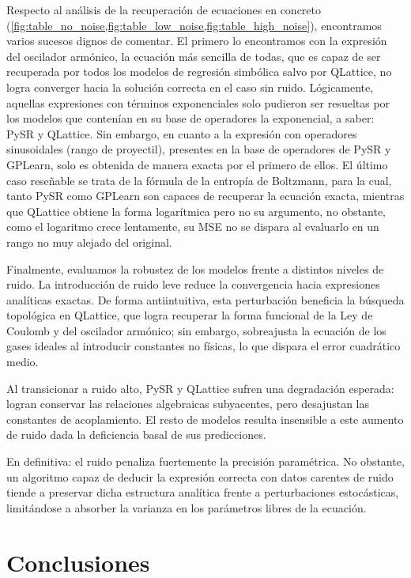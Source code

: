 \documentclass[11pt, a4paper]{article}
\begin{document}
Respecto al análisis de la recuperación de ecuaciones en concreto (\cref{fig:table_no_noise,fig:table_low_noise,fig:table_high_noise}), encontramos varios sucesos dignos de comentar. El primero lo encontramos con la expresión del oscilador armónico, la ecuación más sencilla de todas, que es capaz de ser recuperada por todos los modelos de regresión simbólica salvo por QLattice, no logra converger hacia la solución correcta en el caso sin ruido. Lógicamente, aquellas expresiones con términos exponenciales solo pudieron ser resueltas por los modelos que contenían en su base de operadores la exponencial, a saber: PySR y QLattice. Sin embargo, en cuanto a la expresión con operadores sinusoidales (rango de proyectil), presentes en la base de operadores de PySR y GPLearn, solo es obtenida de manera exacta por el primero de ellos. El último caso reseñable se trata de la fórmula de la entropía de Boltzmann, para la cual, tanto PySR como GPLearn son capaces de recuperar la ecuación exacta, mientras que QLattice obtiene la forma logarítmica pero no su argumento, no obstante, como el logaritmo crece lentamente, su MSE no se dispara al evaluarlo en un rango no muy alejado del original.

Finalmente, evaluamos la robustez de los modelos frente a distintos niveles de ruido. La introducción de ruido leve reduce la convergencia hacia expresiones analíticas exactas. De forma antiintuitiva, esta perturbación beneficia la búsqueda topológica en QLattice, que logra recuperar la forma funcional de la Ley de Coulomb y del oscilador armónico; sin embargo, sobreajusta la ecuación de los gases ideales al introducir constantes no físicas, lo que dispara el error cuadrático medio. 

Al transicionar a ruido alto, PySR y QLattice sufren una degradación esperada: logran conservar las relaciones algebraicas subyacentes, pero desajustan las constantes de acoplamiento. El resto de modelos resulta insensible a este aumento de ruido dada la deficiencia basal de sus predicciones.

En definitiva: el ruido penaliza fuertemente la precisión paramétrica. No obstante, un algoritmo capaz de deducir la expresión correcta con datos carentes de ruido tiende a preservar dicha estructura analítica frente a perturbaciones estocásticas, limitándose a absorber la varianza en los parámetros libres de la ecuación.


\section{Conclusiones}
\end{document}
